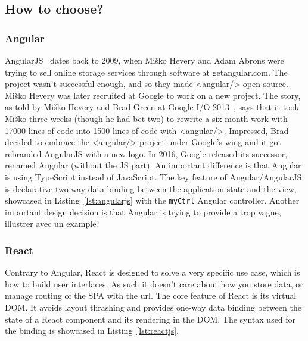 \subsection{How to choose?}%
\label{sub:how_to_choose_}

\subsubsection{Angular}%
\label{ssub:angular}

AngularJS~\cite{hevery2009declarative} dates back to 2009, when Miško Hevery and Adam Abrons
were trying to sell online storage services through software at getangular.com.
The project wasn't successful enough, and so they made <angular/> open source.
Miško Hevery was later recruited at Google to work on a new project.
The story, as told by Miško Hevery and Brad Green at Google I/O 2013~\cite{angularjs-googleio},
says that it took Miško three weeks (though he had bet two) to rewrite a six-month work
with 17000 lines of code into 1500 lines of code with <angular/>.
Impressed, Brad decided to embrace the <angular/> project under Google's wing
and it got rebranded AngularJS with a new logo.
In 2016, Google released its successor, renamed Angular (without the JS part).
An important difference is that Angular is using TypeScript instead of JavaScript.
The key feature of Angular/AngularJS is declarative two-way data binding
between the application state and the view,
showcased in Listing~\ref{lst:angularjs} with the \verb|myCtrl| Angular controller.
Another important design decision is that Angular is trying
to provide a 
{trop vague, illustrer avec un example?}



\subsubsection{React}%
\label{ssub:react}

Contrary to Angular, React is designed to solve a very specific use case,
which is how to build user interfaces.
As such it doesn't care about how you store data,
or manage routing of the SPA with the url.
The core feature of React is its virtual DOM.
It avoids layout thrashing and provides one-way data binding
between the state of a React component
and its rendering in the DOM.\@
The syntax used for the binding is showcased in Listing~\ref{lst:reactjs}.

